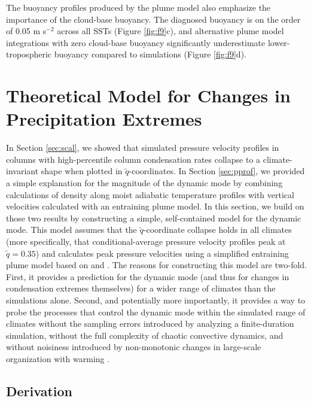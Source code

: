\documentclass[twocol]{ametsoc}
\begin{document}
The buoyancy profiles produced by the plume model also emphasize the importance of the cloud-base buoyancy. The diagnosed buoyancy is on the order of 0.05 m s$^{-2}$ across all SSTs (Figure \ref{fig:f9}c), and alternative plume model integrations with zero cloud-base buoyancy significantly underestimate lower-tropospheric buoyancy compared to simulations (Figure \ref{fig:f9}d).

\section{Theoretical Model for Changes in Precipitation Extremes} \label{sec:mod}

In Section \ref{sec:scal}, we showed that simulated pressure velocity profiles in columns with high-percentile column condensation rates collapse to a climate-invariant shape when plotted in $\tilde{q}$-coordinates. In Section \ref{sec:pprof}, we provided a simple explanation for the magnitude of the dynamic mode by combining calculations of density along moist adiabatic temperature profiles with vertical velocities calculated with an entraining plume model. In this section, we build on those two results by constructing a simple, self-contained model for the dynamic mode. This model assumes that the $\tilde{q}$-coordinate collapse holds in all climates (more specifically, that conditional-average pressure velocity profiles peak at $\tilde{q} = 0.35$) and calculates peak pressure velocities using a simplified entraining plume model based on \citet{Singh2013InfluenceEquilibrium} and \citet{Singh2015IncreasesEquilibrium}. The reasons for constructing this model are two-fold. First, it provides a prediction for the dynamic mode (and thus for changes in condensation extremes themselves) for a wider range of climates than the simulations alone. Second, and potentially more importantly, it provides a way to probe the processes that control the dynamic mode within the simulated range of climates without the sampling errors introduced by analyzing a finite-duration simulation, without the full complexity of chaotic convective dynamics, and without noisiness introduced by non-monotonic changes in large-scale organization with warming \citep{Wing2016Self-aggregationGeometry}.

\subsection{Derivation}
\end{document}
